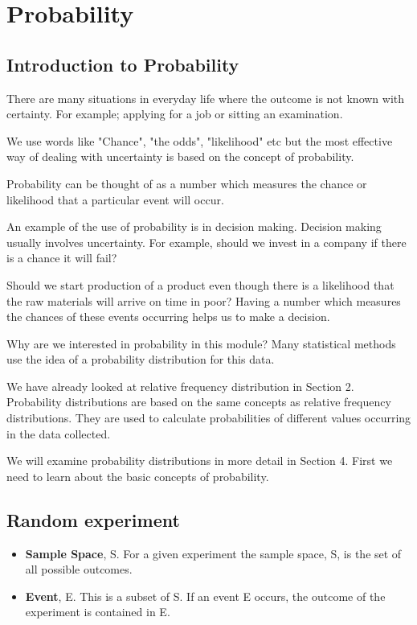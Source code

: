 

\newpage
\section{Probability}

\subsection{Introduction to Probability}

There are many situations in everyday life where the outcome is not known with certainty. For example; applying for a job or sitting an examination.

We use words like "Chance", "the odds", "likelihood" etc but the most effective way of dealing with uncertainty is based on the concept of probability.

Probability can be thought of as a number which measures the chance or likelihood that a particular event will occur.


An example of the use of probability is in decision making. Decision making usually involves uncertainty. For example, should we invest in a company if there is a chance it will fail? 

Should we start production of a product even though there is a likelihood that the raw materials will arrive on time in poor? Having a number which measures the chances of these events occurring helps us to make a decision.



Why are we interested in probability in this module? Many statistical methods use the idea of a probability distribution for this data.

We have already looked at relative frequency distribution in Section 2. Probability distributions are based on the same concepts as relative frequency distributions. They are used to calculate probabilities of different values occurring in the data collected.

We will examine probability distributions in more detail in Section 4. First we need to learn about the basic concepts of probability.


\subsection{Random experiment}
\begin{itemize}
\item \textbf{Sample Space}, S. For a given experiment the sample space, S, is the set of all
possible outcomes.
\item \textbf{Event}, E. This is a subset of S. If an event E occurs, the outcome of the experiment is contained in E.
\end{itemize}

